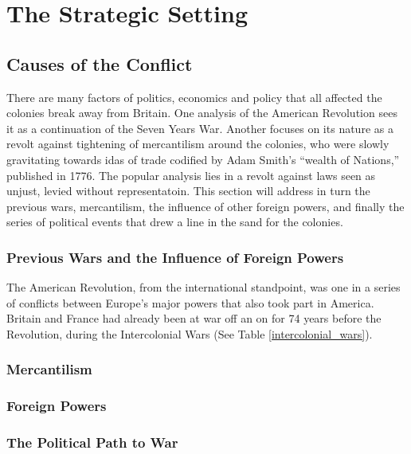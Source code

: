 \newpage
\section{The Strategic Setting}

\subsection{Causes of the Conflict}

There are many factors of politics, economics and policy that all affected the
colonies break away from Britain. One analysis of the American Revolution sees it
as a continuation of the Seven Years War. Another focuses on its nature as a
revolt against tightening of mercantilism around the colonies, who were slowly
gravitating towards idas of trade codified by Adam Smith's ``wealth of
Nations,'' published in 1776. The popular analysis lies in a revolt
against laws seen as unjust, levied without representatoin. This section will
address in turn the previous wars, mercantilism, the influence of other foreign
powers, and finally the series of political events that drew a line in the sand
for the colonies.

\subsubsection{Previous Wars and the Influence of Foreign Powers}

The American Revolution, from the international standpoint, was one in a series
of conflicts between Europe's major powers that also took part in America.
Britain and France had already been at war off an on for 74 years before
the Revolution, during the Intercolonial Wars (See Table
\ref{intercolonial_wars}).



\subsubsection{Mercantilism}

\subsubsection{Foreign Powers}

\subsubsection{The Political Path to War}


